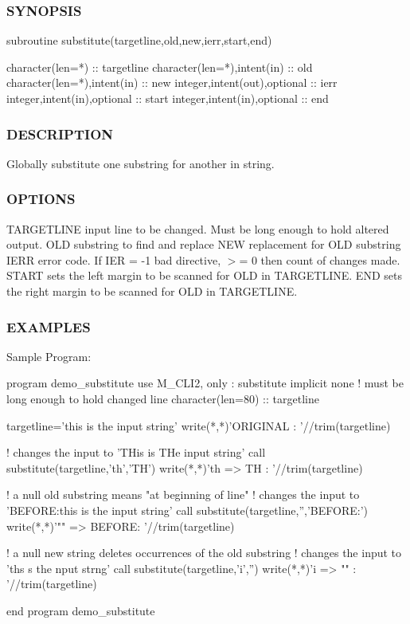 \subsubsection*{S\+Y\+N\+O\+P\+S\+IS}

\begin{DoxyVerb}subroutine substitute(targetline,old,new,ierr,start,end)

 character(len=*)              :: targetline
 character(len=*),intent(in)   :: old
 character(len=*),intent(in)   :: new
 integer,intent(out),optional  :: ierr
 integer,intent(in),optional   :: start
 integer,intent(in),optional   :: end
\end{DoxyVerb}
 \subsubsection*{D\+E\+S\+C\+R\+I\+P\+T\+I\+ON}

Globally substitute one substring for another in string.

\subsubsection*{O\+P\+T\+I\+O\+NS}

T\+A\+R\+G\+E\+T\+L\+I\+NE input line to be changed. Must be long enough to hold altered output. O\+LD substring to find and replace N\+EW replacement for O\+LD substring I\+E\+RR error code. If I\+ER = -\/1 bad directive, $>$= 0 then count of changes made. S\+T\+A\+RT sets the left margin to be scanned for O\+LD in T\+A\+R\+G\+E\+T\+L\+I\+NE. E\+ND sets the right margin to be scanned for O\+LD in T\+A\+R\+G\+E\+T\+L\+I\+NE.

\subsubsection*{E\+X\+A\+M\+P\+L\+ES}

Sample Program\+: \begin{DoxyVerb}program demo_substitute
use M_CLI2, only : substitute
implicit none
! must be long enough to hold changed line
character(len=80) :: targetline

targetline='this is the input string'
write(*,*)'ORIGINAL    : '//trim(targetline)

! changes the input to 'THis is THe input string'
call substitute(targetline,'th','TH')
write(*,*)'th => TH    : '//trim(targetline)

! a null old substring means "at beginning of line"
! changes the input to 'BEFORE:this is the input string'
call substitute(targetline,'','BEFORE:')
write(*,*)'"" => BEFORE: '//trim(targetline)

! a null new string deletes occurrences of the old substring
! changes the input to 'ths s the nput strng'
call substitute(targetline,'i','')
write(*,*)'i => ""     : '//trim(targetline)

end program demo_substitute
\end{DoxyVerb}


